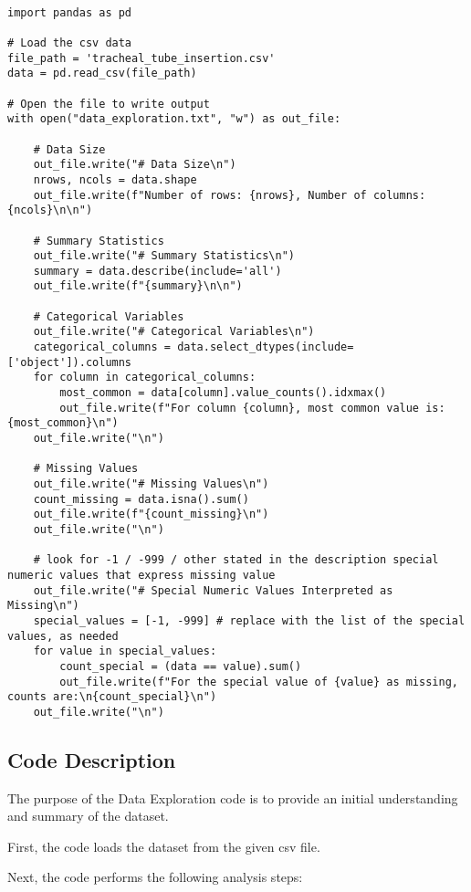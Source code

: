 \documentclass[11pt]{article}
\begin{document}
\begin{verbatim}

import pandas as pd

# Load the csv data
file_path = 'tracheal_tube_insertion.csv'
data = pd.read_csv(file_path)

# Open the file to write output
with open("data_exploration.txt", "w") as out_file:

    # Data Size
    out_file.write("# Data Size\n")
    nrows, ncols = data.shape
    out_file.write(f"Number of rows: {nrows}, Number of columns: {ncols}\n\n")

    # Summary Statistics
    out_file.write("# Summary Statistics\n")
    summary = data.describe(include='all')
    out_file.write(f"{summary}\n\n")

    # Categorical Variables
    out_file.write("# Categorical Variables\n")
    categorical_columns = data.select_dtypes(include=['object']).columns
    for column in categorical_columns:
        most_common = data[column].value_counts().idxmax()
        out_file.write(f"For column {column}, most common value is: {most_common}\n")
    out_file.write("\n")

    # Missing Values
    out_file.write("# Missing Values\n")
    count_missing = data.isna().sum()
    out_file.write(f"{count_missing}\n")
    out_file.write("\n")

    # look for -1 / -999 / other stated in the description special numeric values that express missing value
    out_file.write("# Special Numeric Values Interpreted as Missing\n")
    special_values = [-1, -999] # replace with the list of the special values, as needed
    for value in special_values:
        count_special = (data == value).sum()
        out_file.write(f"For the special value of {value} as missing, counts are:\n{count_special}\n")
    out_file.write("\n")

\end{verbatim}

\subsection{Code Description}

The purpose of the Data Exploration code is to provide an initial understanding and summary of the dataset. 

First, the code loads the dataset from the given csv file. 

Next, the code performs the following analysis steps:
\end{document}
